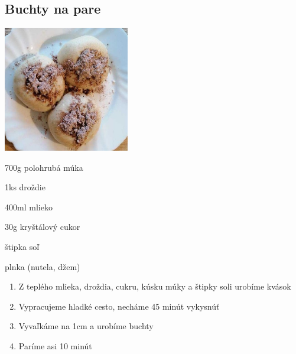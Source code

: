 \setcounter{step}{0}
\subsection{Buchty na pare}

\begin{ingredient}
\includegraphics[height=5.5cm]{images/buchty_na_pare}
\def\portions{4}%

\begin{main}
	\item 700g polohrubá múka
	\item 1ks droždie
	\item 400ml mlieko
	\item 30g kryštálový cukor
	\item štipka soľ
	\item plnka (nutela, džem)
\end{main}
\end{ingredient}
\begin{recipe}

\begin{enumerate}

\item{Z teplého mlieka, droždia, cukru, kúsku múky a štipky soli urobíme kvások}
\item{Vypracujeme hladké cesto, necháme 45 minút vykysnúť}
\item{Vyvaľkáme na 1cm a urobíme buchty}
\item{Paríme asi 10 minút}	

\end{enumerate}
\end{recipe}

\begin{notes}

\end{notes}
\clearpage	